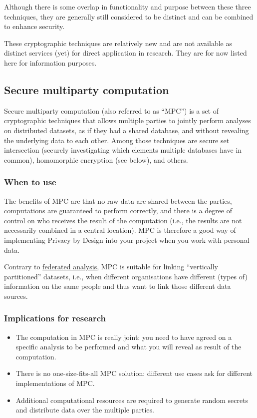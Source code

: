 \documentclass[
]{book}
\providecommand{\tightlist}{%
  \setlength{\itemsep}{0pt}\setlength{\parskip}{0pt}}
\begin{document}
Although there is some overlap in functionality and purpose between these three techniques, they are generally still considered to be distinct and can be combined to enhance security.

These cryptographic techniques are relatively new and are not available as
distinct services (yet) for direct application in research. They are for now
listed here for information purposes.

\hypertarget{mpc}{%
\subsection{Secure multiparty computation}\label{mpc}}

Secure multiparty computation (also referred to as ``MPC'') is a set of
cryptographic techniques that allows multiple parties to jointly perform analyses
on distributed datasets, as if they had a shared database, and without revealing
the underlying data to each other. Among those techniques are secure set
intersection (securely investigating which elements multiple databases have in
common), homomorphic encryption (see below), and others.

\hypertarget{when-to-use-3}{%
\subsubsection{When to use}\label{when-to-use-3}}

The benefits of MPC are that no raw data are shared between the parties,
computations are guaranteed to perform correctly, and there is a degree of
control on who receives the result of the computation (i.e., the results are
not necessarily combined in a central location). MPC is therefore a good way of
implementing Privacy by Design into your project when you work with personal
data.

Contrary to \protect\hyperlink{federated-analysis}{federated analysis}, MPC is suitable for
linking ``vertically partitioned'' datasets, i.e., when different organisations
have different (types of) information on the same people and thus want to link
those different data sources.

\hypertarget{implications-for-research-3}{%
\subsubsection{Implications for research}\label{implications-for-research-3}}

\begin{itemize}
\tightlist
\item
  The computation in MPC is really joint: you need to have agreed on a specific
  analysis to be performed and what you will reveal as result of the computation.
\item
  There is no one-size-fits-all MPC solution: different use cases ask for
  different implementations of MPC.
\item
  Additional computational resources are required to generate random secrets
  and distribute data over the multiple parties.
\end{itemize}
\end{document}
